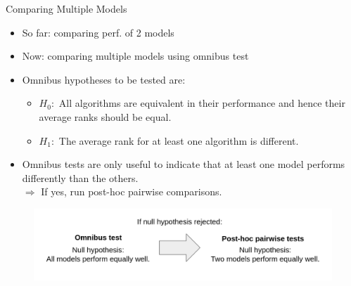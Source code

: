 \documentclass[11pt,compress,t,notes=noshow, aspectratio=169, xcolor=table]{beamer}
\begin{document}
\begin{frame}{Comparing Multiple Models}

\begin{itemize}
    \setlength\itemsep{1em}
    \item So far: comparing perf. of 2 models
    \item Now: comparing multiple models using omnibus test
    \item Omnibus hypotheses to be tested are:
        \begin{itemize}
            \item $H_0:$ All algorithms are equivalent in their performance and hence their average ranks should be equal.
            \item $H_1:$ The average rank for at least one algorithm is different.
        \end{itemize}
    \item Omnibus tests are only useful to indicate that at least one model performs differently than the others.\\
    $\Rightarrow$ If yes, run post-hoc pairwise comparisons.
\end{itemize}

\begin{figure}
    \centering
    \includegraphics{figure/omnibustesting.png}
\end{figure}

\end{frame}

\end{document}
